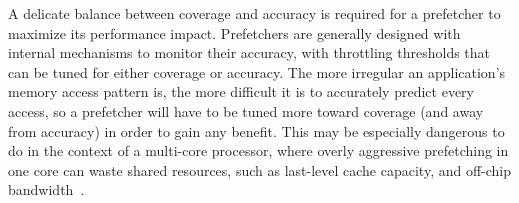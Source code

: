 A delicate balance between coverage and accuracy is required for a prefetcher to maximize
its performance impact.  Prefetchers are generally designed with internal mechanisms to
monitor their accuracy, with throttling thresholds that can be tuned for either coverage 
or accuracy.  The more irregular an application's memory access pattern is, the more difficult
it is to accurately predict every access, so a prefetcher will have to be tuned more toward
coverage (and away from accuracy) in order to gain any benefit.  This may be especially dangerous
to do in the context of a multi-core processor, where overly aggressive prefetching in one core can
waste shared resources, such as last-level cache capacity, and off-chip bandwidth~\cite{Friendly}.



